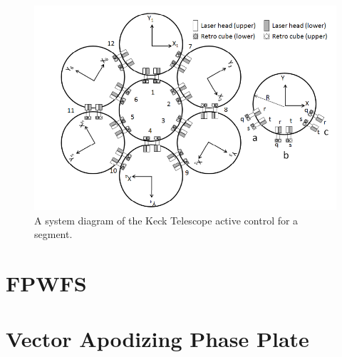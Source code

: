 \begin{figure}[H]
\centering
\includegraphics[width=12 cm]{Figures/GMT_phase_measure.png}
\caption{A system diagram of the Keck Telescope active control for a segment.}
\label{fig:active_control}
\end{figure}



\section{FPWFS}
\label{sec:fpwfs}



\section{Vector Apodizing Phase Plate}
\label{sec:vAPP}








